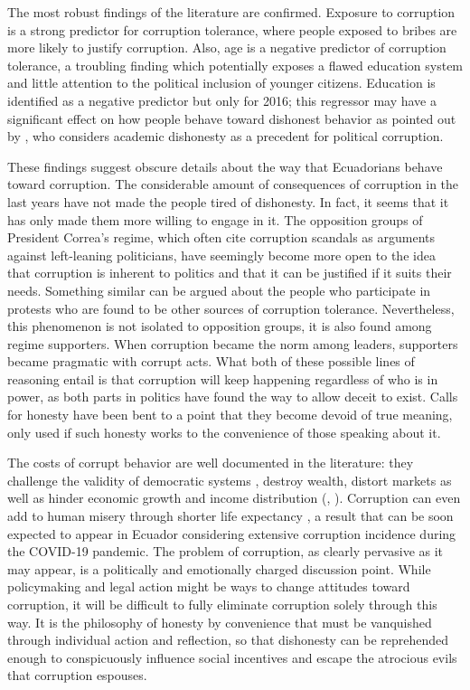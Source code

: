 \documentclass[12pt,a4]{article}\usepackage[]{graphicx}\usepackage[]{xcolor}
\begin{document}
The most robust findings of the literature are confirmed. Exposure to corruption is a strong predictor for corruption tolerance, where people exposed to bribes are more likely to justify corruption. Also, age is a negative predictor of corruption tolerance, a troubling finding which potentially exposes a flawed education system and little attention to the political inclusion of younger citizens. Education is identified as a negative predictor but only for 2016; this regressor may have a significant effect on how people behave toward dishonest behavior as pointed out by \textcite{Adoum.2000}, who considers academic dishonesty as a precedent for political corruption. 

These findings suggest obscure details about the way that Ecuadorians behave toward corruption. The considerable amount of consequences of corruption in the last years have not made the people tired of dishonesty. In fact, it seems that it has only made them more willing to engage in it. The opposition groups of President Correa's regime, which often cite corruption scandals as arguments against left-leaning politicians, have seemingly become more open to the idea that corruption is inherent to politics and that it can be justified if it suits their needs. Something similar can be argued about the people who participate in protests who are found to be other sources of corruption tolerance. Nevertheless, this phenomenon is not isolated to opposition groups, it is also found among regime supporters. When corruption became the norm among leaders, supporters became pragmatic with corrupt acts. What both of these possible lines of reasoning entail is that corruption will keep happening regardless of who is in power, as both parts in politics have found the way to allow deceit to exist. Calls for honesty have been bent to a point that they become devoid of true meaning, only used if such honesty works to the convenience of those speaking about it. 

The costs of corrupt behavior are well documented in the literature: they challenge the validity of democratic systems \parencite{Moscoso.2018}, destroy wealth, distort markets as well as hinder economic growth and income distribution (\textcite{Shleifer.1993}, \textcite{Singer.2016}). Corruption can even add to human misery through shorter life expectancy \parencite{Siverson.2014}, a result that can be soon expected to appear in Ecuador considering extensive corruption incidence during the COVID-19 pandemic. The problem of corruption, as clearly pervasive as it may appear, is a politically and emotionally charged discussion point. While policymaking and legal action might be ways to change attitudes toward corruption, it will be difficult to fully eliminate corruption solely through this way. It is the philosophy of honesty by convenience that must be vanquished through individual action and reflection, so that dishonesty can be reprehended enough to conspicuously influence social incentives and escape the atrocious evils that corruption espouses. 
\end{document}
